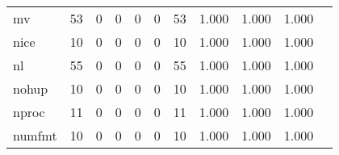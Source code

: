 \begin{longtable}{lp{1.2cm}p{1.2cm}p{1.2cm}p{1.2cm}p{1.2cm}p{1.2cm}p{1.2cm}p{1.2cm}p{1.2cm}p{1.2cm}}
mv        &                                    53 &                                                  0 &                                                  0 &                                                  0 &                                                  0 &                                                 53 &                                              1.000 &                                              1.000 &                                              1.000 \\
nice      &                                    10 &                                                  0 &                                                  0 &                                                  0 &                                                  0 &                                                 10 &                                              1.000 &                                              1.000 &                                              1.000 \\
nl        &                                    55 &                                                  0 &                                                  0 &                                                  0 &                                                  0 &                                                 55 &                                              1.000 &                                              1.000 &                                              1.000 \\
nohup     &                                    10 &                                                  0 &                                                  0 &                                                  0 &                                                  0 &                                                 10 &                                              1.000 &                                              1.000 &                                              1.000 \\
nproc     &                                    11 &                                                  0 &                                                  0 &                                                  0 &                                                  0 &                                                 11 &                                              1.000 &                                              1.000 &                                              1.000 \\
numfmt    &                                    10 &                                                  0 &                                                  0 &                                                  0 &                                                  0 &                                                 10 &                                              1.000 &                                              1.000 &                                              1.000 \\

\end{longtable}
